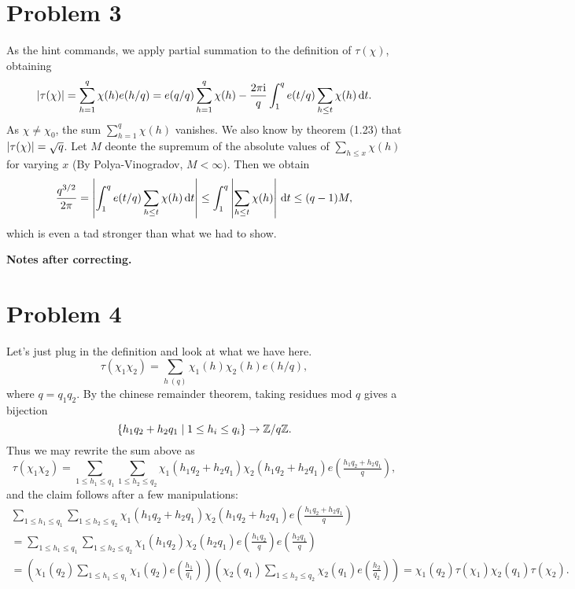 \documentclass[a4paper,11pt]{article}
\begin{document}
\section*{Problem 3}
As the hint commands, we apply partial summation to the definition of
$\tau(\chi)$, obtaining
\[
    \left\lvert \tau(\chi) \right\rvert = \sum_{h=1}^q \chi(h) e(h/q) = e(q/q) \sum_{h=1}^q
    \chi(h) - \frac{2\pi \mathrm i}{q} \int_1^q e(t/q) \sum_{h \leq t} \chi(h) 
    \mathrm{\,d} t.
\]
As $\chi \neq \chi_0$, the sum $\sum_{h=1}^q \chi(h)$ vanishes. We also
know by theorem (1.23) that $\left\lvert \tau(\chi) \right\rvert = \sqrt q$. 
Let $M$ deonte the supremum of the absolute values of $\sum_{h \leq x}
\chi(h)$ for varying $x$ (By Polya-Vinogradov, $M < \infty$). Then we obtain
\[
    \frac{q^{3/2}}{2 \pi} = \left\lvert \int_1^q e(t/q) \sum_{h \leq t} \chi(h) \mathrm{\,d} t \right\rvert \leq \int_1^q \left\lvert  \sum_{h \leq t}  \chi(h)  \right\rvert \mathrm{\,d} t \leq (q-1)M,
\]
which is even a tad stronger than what we had to show. 

\textbf{Notes after correcting.} \leavevmode

\section*{Problem 4}
Let's just plug in the definition and look at what we have here.
\[
    \tau(\chi_1 \chi_2) = \sum_{h \ (q)} \chi_1(h) \chi_2(h) e(h/q),
\]
where $q = q_1 q_2$. By the chinese remainder theorem, taking residues mod $q$ gives
a bijection
\[
    \{h_1 q_2 + h_2 q_1 \mid 1 \leq h_i \leq q_i\} \to \mathbb{Z}/q\mathbb{Z}.
\]
Thus we may rewrite the sum above as 
\[
    \tau(\chi_1 \chi_2) = \sum_{1 \leq h_1 \leq q_1} \sum_{1 \leq h_2 \leq q_2}\chi_1(h_1q_2 + h_2q_1) \chi_2(h_1q_2 + h_2 q_1) e(\tfrac{h_1q_2+h_2q_1}q),
\]
and the claim follows after a few manipulations:
\begin{multline*}
     \sum_{1 \leq h_1 \leq q_1} \sum_{1 \leq h_2 \leq q_2}\chi_1(h_1q_2 + h_2q_1) \chi_2(h_1q_2
     + h_2 q_1) e(\tfrac{h_1q_2+h_2q_1}q) \\
     = \sum_{1 \leq h_1 \leq q_1} \sum_{1 \leq h_2 \leq q_2}\chi_1(h_1q_2) \chi_2(h_2 q_1)
     e(\tfrac{h_1q_2}q) e(\tfrac{h_2q_1}q) \\ 
     = \left(\chi_1(q_2)\sum_{1 \leq h_1 \leq q_1}
     \chi_1(q_2)e(\tfrac{h_1}{q_1})\right) \left(\chi_2(q_1)\sum_{1 \leq h_2 \leq q_2}
     \chi_2(q_1)e(\tfrac{h_2}{q_2})\right) = \chi_1(q_2)\tau(\chi_1) \chi_2(q_1)\tau(\chi_2).
\end{multline*}
\end{document}
